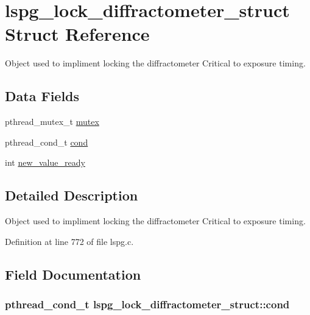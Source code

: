 \hypertarget{structlspg__lock__diffractometer__struct}{\section{lspg\-\_\-lock\-\_\-diffractometer\-\_\-struct Struct Reference}
\label{structlspg__lock__diffractometer__struct}
}


Object used to impliment locking the diffractometer Critical to exposure timing.  


\subsection*{Data Fields}
\begin{DoxyCompactItemize}
\item 
pthread\-\_\-mutex\-\_\-t \hyperlink{structlspg__lock__diffractometer__struct_a362e848dfd1551428b8d12d8776fd2ed}{mutex}
\item 
pthread\-\_\-cond\-\_\-t \hyperlink{structlspg__lock__diffractometer__struct_a7614c802af37c1d3358479a2c13ac898}{cond}
\item 
int \hyperlink{structlspg__lock__diffractometer__struct_ae94acdf44008ce48930e3083f08f5b6c}{new\-\_\-value\-\_\-ready}
\end{DoxyCompactItemize}


\subsection{Detailed Description}
Object used to impliment locking the diffractometer Critical to exposure timing. 

Definition at line 772 of file lspg.\-c.



\subsection{Field Documentation}
\hypertarget{structlspg__lock__diffractometer__struct_a7614c802af37c1d3358479a2c13ac898}{
\subsubsection[{cond}]{\setlength{\rightskip}{0pt plus 5cm}pthread\-\_\-cond\-\_\-t lspg\-\_\-lock\-\_\-diffractometer\-\_\-struct\-::cond}}\label{structlspg__lock__diffractometer__struct_a7614c802af37c1d3358479a2c13ac898}


